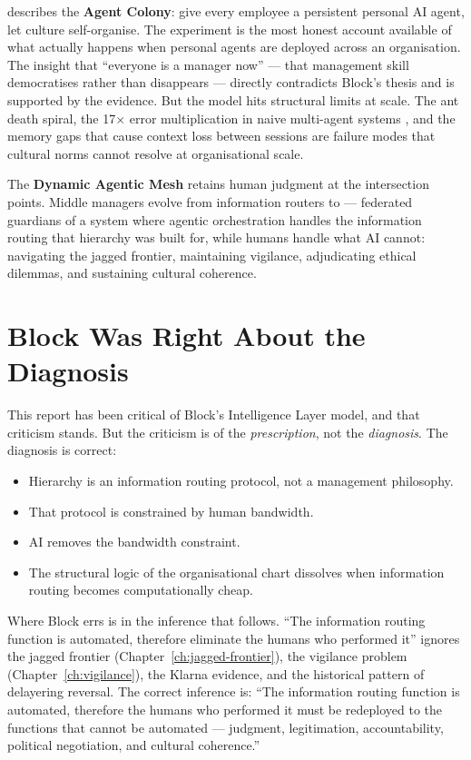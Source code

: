 \textcite{Shipper2026} describes the \textbf{Agent Colony}: give every employee a persistent personal AI agent, let culture self-organise. The experiment is the most honest account available of what actually happens when personal agents are deployed across an organisation. The insight that ``everyone is a manager now'' --- that management skill democratises rather than disappears --- directly contradicts Block's thesis and is supported by the evidence. But the model hits structural limits at scale. The ant death spiral, the 17$\times$ error multiplication in naive multi-agent systems \parencite{TDS2026}, and the memory gaps that cause context loss between sessions are failure modes that cultural norms cannot resolve at organisational scale.

The \textbf{Dynamic Agentic Mesh} retains human judgment at the intersection points. Middle managers evolve from information routers to  --- federated guardians of a system where agentic orchestration handles the information routing that hierarchy was built for, while humans handle what AI cannot: navigating the jagged frontier, maintaining vigilance, adjudicating ethical dilemmas, and sustaining cultural coherence.

\section{Block Was Right About the Diagnosis}

This report has been critical of Block's Intelligence Layer model, and that criticism stands. But the criticism is of the \emph{prescription}, not the \emph{diagnosis}. The diagnosis is correct:

\begin{itemize}
  \item Hierarchy is an information routing protocol, not a management philosophy.
  \item That protocol is constrained by human bandwidth.
  \item AI removes the bandwidth constraint.
  \item The structural logic of the organisational chart dissolves when information routing becomes computationally cheap.
\end{itemize}

Where Block errs is in the inference that follows. ``The information routing function is automated, therefore eliminate the humans who performed it'' ignores the jagged frontier (Chapter~\ref{ch:jagged-frontier}), the vigilance problem (Chapter~\ref{ch:vigilance}), the Klarna evidence, and the historical pattern of delayering reversal. The correct inference is: ``The information routing function is automated, therefore the humans who performed it must be redeployed to the functions that cannot be automated --- judgment, legitimation, accountability, political negotiation, and cultural coherence.''

